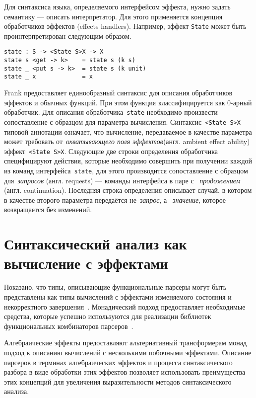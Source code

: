 \documentclass [a4paper] {article}
\begin{document}
Для синтаксиса языка, определяемого интерфейсом эффекта, нужно задать
семантику --- описать интерпретатор. Для этого применяется концепция
обработчиков эффектов  (effects handlers). Например, эффект \texttt{State}
может быть проинтерпретирован следующим образом.

\begin{verbatim}
state : S -> <State S>X -> X
state s <get -> k>    = state s (k s)
state _ <put s -> k>  = state s (k unit)
state _ x             = x
\end{verbatim}

Frank предоставляет единообразный синтаксис для описания обработчиков эффектов
и обычных функций. При этом функция классифицируется как 0-арный обработчик.
Для описания обработчика~\texttt{state} необходимо произвести сопоставление с
образцом для параметра-вычисления. Синтаксис~\texttt{<State S>X} типовой
аннотации означает, что вычисление, передаваемое в качестве параметра может
требовать от~\emph{охватывающего поля эффектов}(англ. ambient effect ability)
эффект~\texttt{<State S>X}. Следующие две строки определения обработчика
специфицируют действия, которые необходимо совершить при получении каждой из
команд интерфейса~\texttt{state}, для этого производится сопоставление с
образцом для~\emph{запросов} (англ. requests) --- команды интерфейса в паре с
~\emph{продожением} (англ. continuation). Последняя строка определения описывает
случай, в котором в качестве второго параметра передаётся не~\emph{запрос}, а
~\emph{значение}, которое возвращается без изменений.

\section{Синтаксический анализ как вычисление с эффектами}

Показано, что типы, описывающие функциональные парсеры могут быть представлены
как типы вычислений с эффектами изменяемого состояния и некорректного
завершения~\cite{monParsing}. Монадический подход предоставляет
необходимые средства, которые успешно используются для реализации библиотек
функциональных комбинаторов парсеров~\cite{parsec}.

Алгебраические эффекты предоставляют альтернативный трансформерам монад подход к
описанию вычислений с несколькими побочными эффектами. Описание парсеров в
терминах алгебраических эффектов и процесса синтаксического разбора в виде
обработки этих эффектов позволяет использовать преимущества этих концепций
для увеличения выразительности методов синтаксического анализа.
\end{document}

